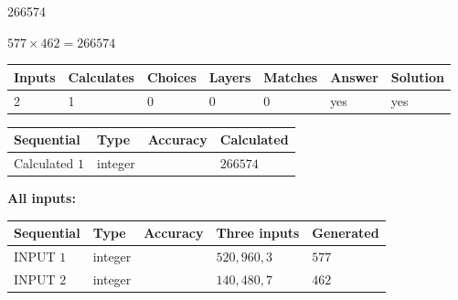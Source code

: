 \documentclass{ctexart}
\begin{document}
\noindent{}
 
 

266574
 
 
\noindent{}
 
 

 
 
 
\noindent{}
 
 

$ %
577 \times  %
462=   %
266574$
 
 
\noindent{}
 
 

 
   
   
   
   
\noindent\begin{tabular}{|l|l|l|l|l|l|l|}
 \hline
Inputs & Calculates & Choices & Layers & Matches & Answer & Solution \\ \hline
 2  & 
 1  & 
 0
  & 
 0  & 
 0  & 
  yes & 
  yes 
  \\ \hline
 \end{tabular}
   
   
   
   
\noindent{}
   
   
  
  
\noindent\begin{tabular}{|l|l|l|l|}
\hline
 Sequential & Type & Accuracy & Calculated \\ 
\hline
 
 
  Calculated $  1 $ & integer &  & 
  $ 266574 $ 
 \\  \hline  
 \end{tabular}
   
   
   
   
\noindent\vspace{0.1in}\hspace{-0.08in} {\textbf{\Large{All inputs: }}}
   
   
  
  
\noindent\begin{tabular}{|l|l|l|l|l|}
\hline
 Sequential & Type & Accuracy & Three inputs & Generated \\ 
\hline
 
 
  INPUT $  1 $ & integer &  & $
 520
 , 
 960
 , 
 3
 $ & $ 577 $ 
 \\  \hline  
 
 
  INPUT $  2 $ & integer &  & $
 140
 , 
 480
 , 
 7
 $ & $ 462 $ 
 \\  \hline  
 \end{tabular}
   
\end{document}
